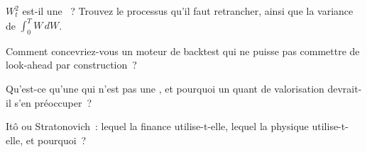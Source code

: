 \begin{interviewq}\label{iq:qm:ito-calculus:3}
$W_t^2$ est-il une ~? Trouvez le processus qu'il faut retrancher, ainsi que la variance de $\int_0^TW\,dW$.
\end{interviewq}

\begin{interviewq}\label{iq:qm:ito-calculus:4}
Comment concevriez-vous un moteur de backtest qui ne puisse pas commettre de look-ahead par construction~?
\end{interviewq}

\begin{interviewq}\label{iq:qm:ito-calculus:5}
Qu'est-ce qu'une  qui n'est pas une , et pourquoi un quant de valorisation devrait-il s'en préoccuper~?
\end{interviewq}

\begin{interviewq}\label{iq:qm:ito-calculus:6}
Itô ou Stratonovich~: lequel la finance utilise-t-elle, lequel la physique utilise-t-elle, et pourquoi~?
\end{interviewq}
